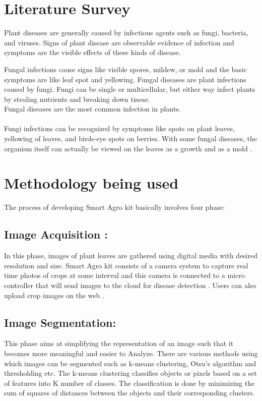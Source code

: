 \documentclass{article}
\begin{document}
\section{Literature Survey}
\large{Plant  diseases are  generally  caused  by  infectious agents  such  as  fungi,  bacteria,  and  viruses.  Signs  of plant disease are observable evidence of infection and symptoms are  the  visible  effects  of  these  kinds  of  disease. 
\bigskip

Fungal infections  cause  signs  like  visible spores,  mildew,  or  mold and the basic symptoms are like leaf spot and yellowing. Fungal   diseases are   plant   infections   caused   by fungi.  Fungi  can  be  single  or  multicellular,  but  either  way infect   plants   by   stealing   nutrients   and   breaking   down tissue. \\
 Fungal diseases  are  the  most  common  infection  in plants. \\\\

 Fungi  infections  can  be  recognized  by  symptoms like  spots  on  plant  leaves,  yellowing  of  leaves,  and  birds-eye   spots on   berries.   With   some   fungal   diseases,   the organism itself can actually be viewed on the leaves as a growth and as a mold .
 }

\section{Methodology being used}

The  process of  developing Smart Agro kit  basically involves  four  phase:

\subsection{Image Acquisition :} In  this  phase,  images  of  plant  leaves  are  gathered using  digital  media with desired  resolution  and  size. Smart Agro kit consists of a camera system to capture real time photos of crops at some interval and this camera is connected to a micro controller that will send images to the cloud for disease detection . Users can also upload crop images on the web . 

\subsection{Image Segmentation:} This  phase  aims  at  simplifying  the  representation of  an  image  such  that  it  becomes  more  meaningful  and easier to Analyze. There  are  various  methods  using  which  images can   be   segmented   such   as   k-means  clustering,  Otsu’s algorithm  and  thresholding  etc.   The  k-means  clustering classifies objects or pixels based on a set of features into K number    of    classes.    The    classification is done by minimizing  the  sum  of  squares  of  distances between the objects and their corresponding clusters. 
\end{document}
